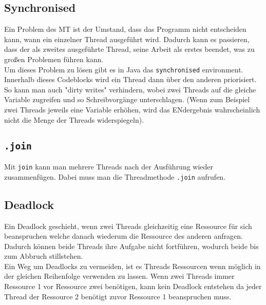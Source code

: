 \documentclass{article}
\begin{document}
	\subsection{Synchronised}
	Ein Problem des MT ist der Umstand, dass das Programm nicht entscheiden kann, wann ein einzelner Thread ausgeführt wird. Dadurch kann es passieren, dass der als zweites ausgeführte Thread, seine Arbeit als erstes beendet, was zu großen Problemen führen kann. \\
	Um dieses Problem zu lösen gibt es in Java das \texttt{synchronised} environment. Innerhalb dieses Codeblocks wird ein Thread dann über den anderen priorisiert. So kann man auch "dirty writes" verhindern, wobei zwei Threads auf die gleiche Variable zugreifen und so Schreibvorgänge unterschlagen. (Wenn zum Beispiel zwei Threads jeweils eine Variable erhöhen, wird das ENdergebnis wahrscheinlich nicht die Menge der Threads widerspiegeln).
	\subsection{\texttt{.join}}
	Mit \texttt{join} kann man mehrere Threads nach der Ausführung wieder zusammenfügen. Dabei muss man die Threadmethode \texttt{.join} aufrufen.
	\subsection{Deadlock}
	Ein Deadlock geschieht, wenn zwei Threads gleichzeitig eine Ressource für sich beanspruchen welche danach wiederum die Ressource des anderen anfragen. Dadurch können beide Threads ihre Aufgabe nicht fortführen, wodurch beide bis zum Abbruch stillstehen. \\
	Ein Weg um Deadlocks zu vermeiden, ist es Threads Ressourcen wenn möglich in der gleichen Reihenfolge verwenden zu lassen. Wenn zwei Threads immer Ressource 1 vor Ressource zwei benötigen, kann kein Deadlock entstehen da jeder Thread der Ressource 2 benötigt zuvor Ressource 1 beanspruchen muss.
\end{document}
